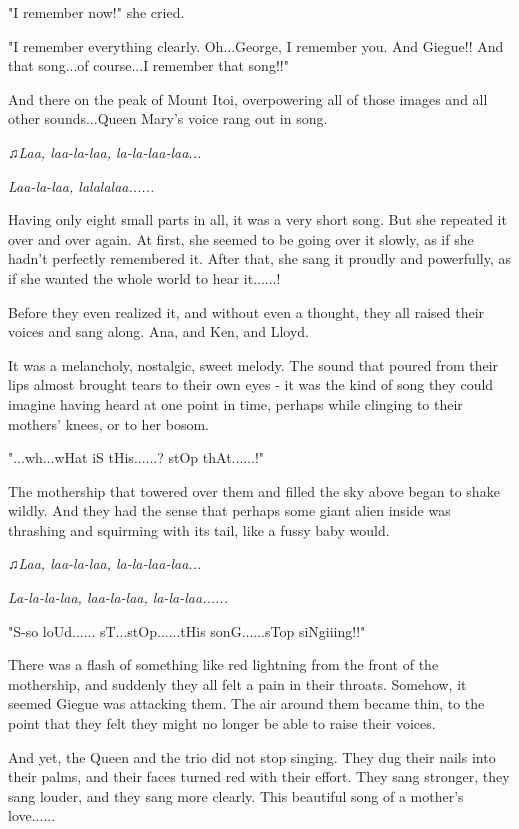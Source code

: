\documentclass[
]{article}
\begin{document}
"I remember now!" she cried.

"I remember everything clearly. Oh...George, I remember you. And
Giegue!! And that song...of course...I remember that song!!"

And there on the peak of Mount Itoi, overpowering all of those images
and all other sounds...Queen Mary's voice rang out in song.

\emph{♫Laa, laa-la-laa, la-la-laa-laa...}

\emph{Laa-la-laa, lalalalaa......}

Having only eight small parts in all, it was a very short song. But she
repeated it over and over again. At first, she seemed to be going over
it slowly, as if she hadn't perfectly remembered it. After that, she
sang it proudly and powerfully, as if she wanted the whole world to hear
it......!

Before they even realized it, and without even a thought, they all
raised their voices and sang along. Ana, and Ken, and Lloyd.

It was a melancholy, nostalgic, sweet melody. The sound that poured from
their lips almost brought tears to their own eyes - it was the kind of
song they could imagine having heard at one point in time, perhaps while
clinging to their mothers' knees, or to her bosom.

"...wh...wHat iS tHis......? stOp thAt......!"

The mothership that towered over them and filled the sky above began to
shake wildly. And they had the sense that perhaps some giant alien
inside was thrashing and squirming with its tail, like a fussy baby
would.

\emph{♫Laa, laa-la-laa, la-la-laa-laa...}

\emph{La-la-la-laa, laa-la-laa, la-la-laa......}

"S-so loUd...... sT...stOp......tHis sonG......sTop siNgiiing!!"

There was a flash of something like red lightning from the front of the
mothership, and suddenly they all felt a pain in their throats. Somehow,
it seemed Giegue was attacking them. The air around them became thin, to
the point that they felt they might no longer be able to raise their
voices.

And yet, the Queen and the trio did not stop singing. They dug their
nails into their palms, and their faces turned red with their effort.
They sang stronger, they sang louder, and they sang more clearly. This
beautiful song of a mother's love......
\end{document}
